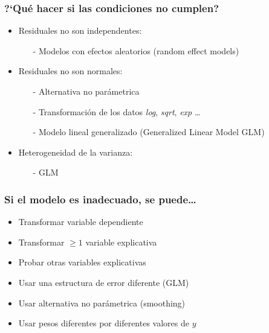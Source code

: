 \documentclass[mathserif]{beamer}
\begin{document}
\begin{frame}[label=assumcheck3]
   \frametitle{?`Qu\'e hacer si las condiciones no cumplen?}
    \begin{itemize}[<+-| visible@+-| handout:1>]
      \item Residuales no son independentes:
         \begin{itemize}
            \item[-] Modelos con efectos aleatorios (random effect models)
         \end{itemize}
      \item Residuales no son normales: 
         \begin{itemize}
            \item[-] Alternativa no par\'ametrica
            \item[-] Transformaci\'on de los datos \emph{log}, \emph{sqrt}, \emph{exp} \ldots
            \item[-] Modelo lineal generalizado (Generalized Linear Model GLM)
         \end{itemize}
      \item Heterogeneidad de la varianza:
         \begin{itemize}
            \item[-] GLM
         \end{itemize}
   \end{itemize}
\end{frame}%

 
\begin{frame}[label=modcrit2]
   \frametitle{Si el modelo es inadecuado, se puede\ldots}
    \begin{itemize}
      \item Transformar variable dependiente
      \item Transformar $\geq1$ variable explicativa
      \item Probar otras variables explicativas
      \item Usar una estructura de error diferente (GLM)
      \item Usar alternativa no par\'ametrica (smoothing)
      \item Usar pesos diferentes por diferentes valores de $y$
   \end{itemize}
\end{frame}%
\end{document}
